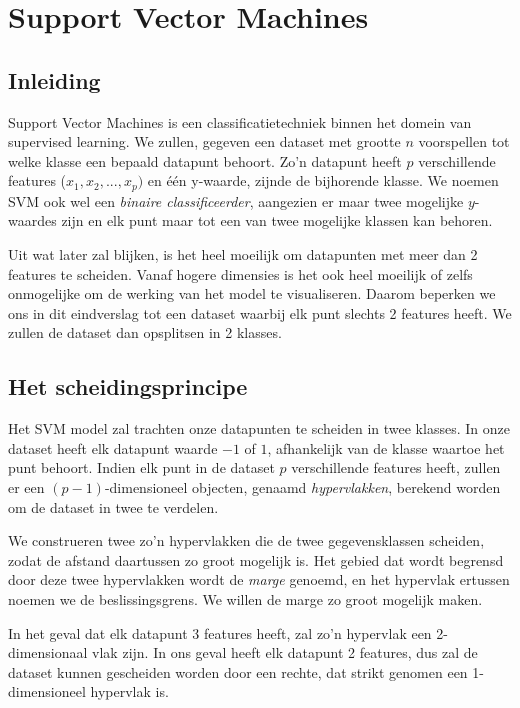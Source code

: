 \documentclass[TeamE-eindrapport]{subfiles}
\begin{document}
	
	\chapter{Support Vector Machines}
	
	\section{Inleiding}
	
	Support Vector Machines is een classificatietechniek binnen het domein van supervised learning. We zullen, gegeven een dataset met grootte \(n\) voorspellen tot welke klasse een bepaald datapunt behoort. Zo'n datapunt heeft \(p\) verschillende features (\(x_1, x_2, ..., x_p)\) en één y-waarde, zijnde de bijhorende klasse. We noemen SVM ook wel een \textit{binaire classificeerder}, aangezien er maar twee mogelijke \(y\)-waardes zijn en elk punt maar tot een van twee mogelijke klassen kan behoren.
	
	Uit wat later zal blijken, is het heel moeilijk om datapunten met meer dan 2 features te scheiden. Vanaf hogere dimensies is het ook heel moeilijk of zelfs onmogelijke om de werking van het model te visualiseren. Daarom beperken we ons in dit eindverslag tot een dataset waarbij elk punt slechts 2 features heeft. We zullen de dataset dan opsplitsen in 2 klasses.
	
	\section{Het scheidingsprincipe}
	
	Het SVM model zal trachten onze datapunten te scheiden in twee klasses. In onze dataset heeft elk datapunt waarde \(-1\) of \(1\), afhankelijk van de klasse waartoe het punt behoort. Indien elk punt in de dataset \(p\) verschillende features heeft, zullen er een \((p-1)\)-dimensioneel objecten, genaamd \textit{hypervlakken}, berekend worden om de dataset in twee te verdelen. 
	
	We construeren twee zo'n hypervlakken die de twee gegevensklassen scheiden, zodat de afstand daartussen zo groot mogelijk is. Het gebied dat wordt begrensd door deze twee hypervlakken wordt de \textit{marge} genoemd, en het hypervlak ertussen noemen we de beslissingsgrens. We willen de marge zo groot mogelijk maken.
	
	In het geval dat elk datapunt 3 features heeft, zal zo'n hypervlak een 2-dimensionaal vlak zijn. In ons geval heeft elk datapunt 2 features, dus zal de dataset kunnen gescheiden worden door een rechte, dat strikt genomen een 1-dimensioneel hypervlak is.
	
\end{document}
